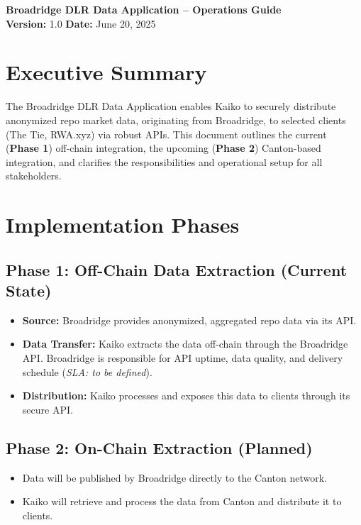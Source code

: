 \documentclass[12pt,a4paper]{article}
\begin{document}
\begin{center}
    {\LARGE\bfseries Broadridge DLR Data Application -- Operations Guide}\\[2ex]
    \textbf{Version:} 1.0 \hspace{2em} \textbf{Date:} June 20, 2025\\
\end{center}

\vspace{1em}

\section*{Executive Summary}
The Broadridge DLR Data Application enables Kaiko to securely distribute anonymized repo market data, originating from Broadridge, to selected clients (The Tie, RWA.xyz) via robust APIs. This document outlines the current (\textbf{Phase 1}) off-chain integration, the upcoming (\textbf{Phase 2}) Canton-based integration, and clarifies the responsibilities and operational setup for all stakeholders.

\section{Implementation Phases}

\subsection*{Phase 1: Off-Chain Data Extraction (Current State)}
\begin{itemize}[leftmargin=*]
    \item \textbf{Source:} Broadridge provides anonymized, aggregated repo data via its API.
    \item \textbf{Data Transfer:} Kaiko extracts the data off-chain through the Broadridge API. Broadridge is responsible for API uptime, data quality, and delivery schedule (\textit{SLA: to be defined}).
    \item \textbf{Distribution:} Kaiko processes and exposes this data to clients through its secure API.
\end{itemize}

\subsection*{Phase 2: On-Chain Extraction (Planned)}
\begin{itemize}[leftmargin=*]
    \item Data will be published by Broadridge directly to the Canton network.
    \item Kaiko will retrieve and process the data from Canton and distribute it to clients.
\end{itemize}
\end{document}
